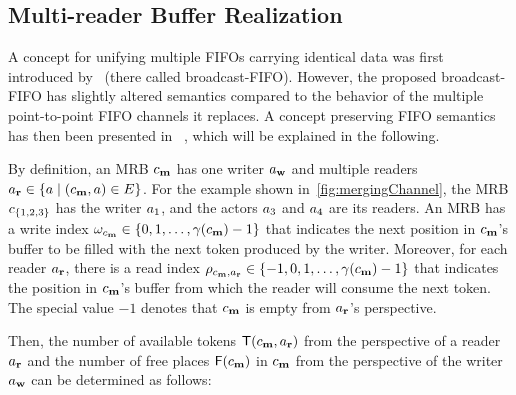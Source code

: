 \subsection{Multi-reader Buffer Realization}

A concept for unifying multiple \acp{FIFO} carrying identical data was first introduced by~\cite{Mamidala:2011} (there called broadcast-\acs{FIFO}).
However, the proposed broadcast-\acs{FIFO} has slightly altered semantics compared to the behavior of the multiple point-to-point \acs{FIFO} channels it replaces.
A concept preserving \ac{FIFO} semantics has then been presented in~\cite{lft_2023-MRBs} , which will be explained in the following.
\par
By definition, an \ac{MRB} $\GenMRB$ has one writer $\Writer$ and multiple readers $\Reader \in \{ \actor \mid (\GenMRB, \actor) \in \SetPGEdges \}$.
For the example shown in~\cref{fig:mergingChannel}, the \ac{MRB} $c_{\{1,2,3\}}$ has the writer $a_1$, and the actors $a_3$ and $a_4$ are its readers.
An \ac{MRB} has a write index $\Write_{\GenMRB} \in \{0,1,\ldots,\Capacity(\GenMRB)-1\}$ that indicates the next position in $\GenMRB$'s buffer to be filled with the next token produced by the writer.
Moreover, for each reader $\Reader$, there is a read index $\Read_{\GenMRB,\Reader} \in \{-1,0,1,\ldots,\Capacity(\GenMRB)-1\}$ that indicates the position in $\GenMRB$'s buffer from which the reader will consume the next token.
The special value $-1$ denotes that $\GenMRB$ is empty from $\Reader$'s perspective.
\par
Then, the number of available tokens $\Tokens(\GenMRB,\Reader)$ from the perspective of a reader $\Reader$ and the number of free places $\Free(\GenMRB)$ in $\GenMRB$ from the perspective of the writer $\Writer$ can be determined as follows:
\vspace{-2mm}\\
